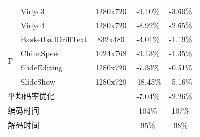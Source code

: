 \begin{table}[!p]
\begin{tabular}{@{}clccc@{}}
                                         & Vidyo3                                    & 1280x720                & -9.10\%                            & -3.60\%                       \\
                                         & Vidyo4                                    & 1280x720                & -8.92\%                            & -2.65\%                       \\
        \multirow{4}{*}{F}               & BasketballDrillText                       & 832x480                 & -3.01\%                            & -1.19\%                       \\
                                         & ChinaSpeed                                & 1024x768                & -9.13\%                            & -1.35\%                       \\
                                         & SlideEditing                              & 1280x720                & -7.33\%                            & -0.51\%                       \\
                                         & SlideShow                                 & 1280x720                & -18.45\%                           & -5.16\%                       \\ \midrule
        \multicolumn{2}{l}{平均码率优化} &                                           & -7.04\%                 & -2.26\%                                                            \\ \midrule
        \multicolumn{2}{l}{编码时间}     &                                           & 104\%                   & 107\%                                                              \\ \midrule
        \multicolumn{2}{l}{解码时间}     &                                           & 95\%                    & 98\%                                                               \\ \bottomrule
    \end{tabular}
\end{table}

